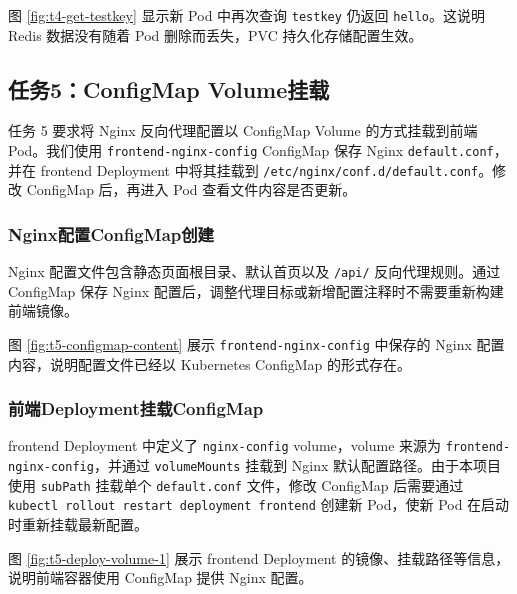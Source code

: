 
图 \ref{fig:t4-get-testkey} 显示新 Pod 中再次查询 \verb|testkey| 仍返回 \verb|hello|。这说明 Redis 数据没有随着 Pod 删除而丢失，PVC 持久化存储配置生效。

\subsection{任务5：ConfigMap Volume挂载}

任务 5 要求将 Nginx 反向代理配置以 ConfigMap Volume 的方式挂载到前端 Pod。我们使用 \verb|frontend-nginx-config| ConfigMap 保存 Nginx \verb|default.conf|，并在 frontend Deployment 中将其挂载到 \verb|/etc/nginx/conf.d/default.conf|。修改 ConfigMap 后，再进入 Pod 查看文件内容是否更新。

\subsubsection{Nginx配置ConfigMap创建}

Nginx 配置文件包含静态页面根目录、默认首页以及 \verb|/api/| 反向代理规则。通过 ConfigMap 保存 Nginx 配置后，调整代理目标或新增配置注释时不需要重新构建前端镜像。


图 \ref{fig:t5-configmap-content} 展示 \verb|frontend-nginx-config| 中保存的 Nginx 配置内容，说明配置文件已经以 Kubernetes ConfigMap 的形式存在。

\subsubsection{前端Deployment挂载ConfigMap}

frontend Deployment 中定义了 \verb|nginx-config| volume，volume 来源为 \verb|frontend-nginx-config|，并通过 \verb|volumeMounts| 挂载到 Nginx 默认配置路径。由于本项目使用 \verb|subPath| 挂载单个 \verb|default.conf| 文件，修改 ConfigMap 后需要通过 \verb|kubectl rollout restart deployment frontend| 创建新 Pod，使新 Pod 在启动时重新挂载最新配置。


图 \ref{fig:t5-deploy-volume-1} 展示 frontend Deployment 的镜像、挂载路径等信息，说明前端容器使用 ConfigMap 提供 Nginx 配置。

